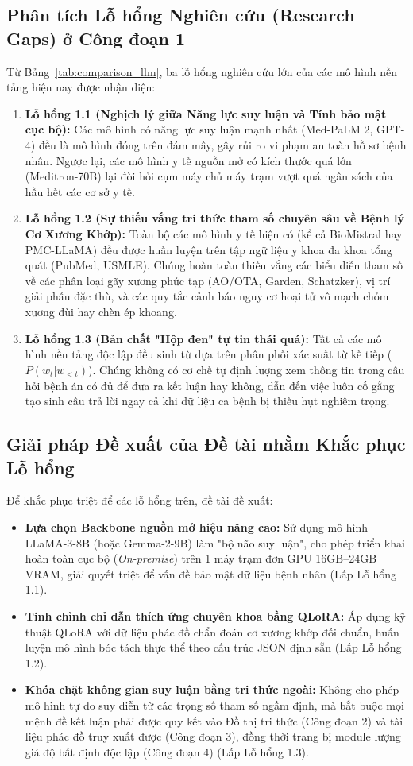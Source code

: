 \clearpage
\subsection{Phân tích Lỗ hổng Nghiên cứu (Research Gaps) ở Công đoạn 1}
Từ Bảng~\ref{tab:comparison_llm}, ba lỗ hổng nghiên cứu lớn của các mô hình nền tảng hiện nay được nhận diện:
\begin{enumerate}
    \item \textbf{Lỗ hổng 1.1 (Nghịch lý giữa Năng lực suy luận và Tính bảo mật cục bộ):} Các mô hình có năng lực suy luận mạnh nhất (Med-PaLM 2, GPT-4) đều là mô hình đóng trên đám mây, gây rủi ro vi phạm an toàn hồ sơ bệnh nhân. Ngược lại, các mô hình y tế nguồn mở có kích thước quá lớn (Meditron-70B) lại đòi hỏi cụm máy chủ máy trạm vượt quá ngân sách của hầu hết các cơ sở y tế.
    \item \textbf{Lỗ hổng 1.2 (Sự thiếu vắng tri thức tham số chuyên sâu về Bệnh lý Cơ Xương Khớp):} Toàn bộ các mô hình y tế hiện có (kể cả BioMistral hay PMC-LLaMA) đều được huấn luyện trên tập ngữ liệu y khoa đa khoa tổng quát (PubMed, USMLE). Chúng hoàn toàn thiếu vắng các biểu diễn tham số về các phân loại gãy xương phức tạp (AO/OTA, Garden, Schatzker), vị trí giải phẫu đặc thù, và các quy tắc cảnh báo nguy cơ hoại tử vô mạch chỏm xương đùi hay chèn ép khoang.
    \item \textbf{Lỗ hổng 1.3 (Bản chất "Hộp đen" tự tin thái quá):} Tất cả các mô hình nền tảng độc lập đều sinh từ dựa trên phân phối xác suất từ kế tiếp ($P(w_t | w_{<t})$). Chúng không có cơ chế tự định lượng xem thông tin trong câu hỏi bệnh án có đủ để đưa ra kết luận hay không, dẫn đến việc luôn cố gắng tạo sinh câu trả lời ngay cả khi dữ liệu ca bệnh bị thiếu hụt nghiêm trọng.
\end{enumerate}

\subsection{Giải pháp Đề xuất của Đề tài nhằm Khắc phục Lỗ hổng}
Để khắc phục triệt để các lỗ hổng trên, đề tài đề xuất:
\begin{itemize}
    \item \textbf{Lựa chọn Backbone nguồn mở hiệu năng cao:} Sử dụng mô hình LLaMA-3-8B (hoặc Gemma-2-9B) làm "bộ não suy luận", cho phép triển khai hoàn toàn cục bộ (\emph{On-premise}) trên 1 máy trạm đơn GPU 16GB--24GB VRAM, giải quyết triệt để vấn đề bảo mật dữ liệu bệnh nhân (Lấp Lỗ hổng 1.1).
    \item \textbf{Tinh chỉnh chỉ dẫn thích ứng chuyên khoa bằng QLoRA:} Áp dụng kỹ thuật QLoRA với dữ liệu phác đồ chẩn đoán cơ xương khớp đối chuẩn, huấn luyện mô hình bóc tách thực thể theo cấu trúc JSON định sẵn (Lấp Lỗ hổng 1.2).
    \item \textbf{Khóa chặt không gian suy luận bằng tri thức ngoài:} Không cho phép mô hình tự do suy diễn từ các trọng số tham số ngầm định, mà bắt buộc mọi mệnh đề kết luận phải được quy kết vào Đồ thị tri thức (Công đoạn 2) và tài liệu phác đồ truy xuất được (Công đoạn 3), đồng thời trang bị module lượng giá độ bất định độc lập (Công đoạn 4) (Lấp Lỗ hổng 1.3).
\end{itemize}

